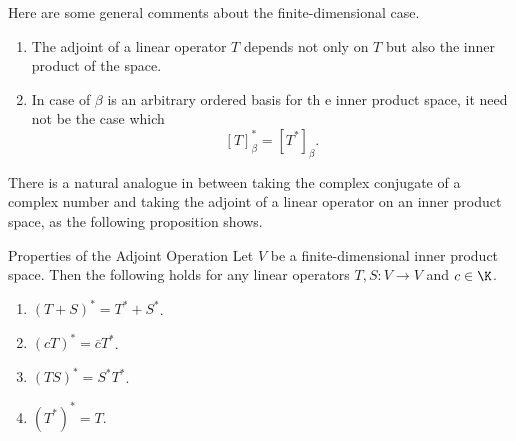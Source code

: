 \documentclass[linearalgebraII]{subfiles}
\begin{document}
    \begin{remark}
        Here are some general comments about the finite-dimensional case.
        \begin{enumerate}
            \item The adjoint of a linear operator $T$ depends not only on $T$ but also the inner product of the space.
            \item In case of $\beta$ is an arbitrary ordered basis for th e inner product space, it need not be the case which
                \begin{equation*}
                    \left[ T \right] _\beta^* = \left[ T^* \right] _\beta.
                \end{equation*}
        \end{enumerate}
    \end{remark}

    \begin{remark}
        There is a natural analogue in between taking the complex conjugate of a complex number and taking the adjoint of a linear operator on an inner product space, as the following proposition shows.
    \end{remark}

    \begin{prop}{Properties of the Adjoint Operation}
        Let $V$ be a finite-dimensional inner product space. Then the following holds for any linear operators $T,S:V\to V$ and $c\in\K$.
        \begin{enumerate}
            \item $\left( T+S \right) ^* = T^* + S^*$.
            \item $\left( cT \right) ^* = \overline{c} T^*$.
            \item $\left( TS \right) ^* = S^*T^*$. 
            \item $\left( T^* \right) ^* = T$.
        \end{enumerate}
    \end{prop}
\end{document}
